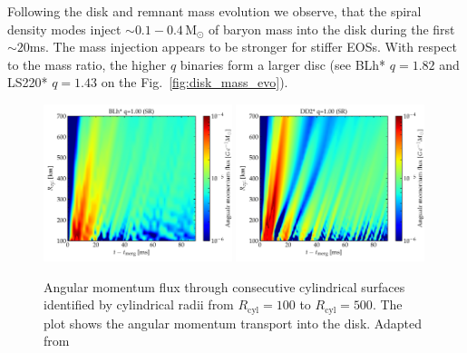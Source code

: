 \documentclass[11pt,a4paper,headinclude=true,DIV=14,BCOR=8mm,chapterprefix,listof=totoc,twoside,openright,abstracton]{scrbook}
\def\Msun{{\text{M}_{\odot}}}
\newcommand{\mr}{mass ratio}
\begin{document}
Following the disk and remnant mass evolution we observe, that the spiral 
density modes inject ${\sim}0.1-0.4\,\Msun$ of baryon mass into the disk during the 
first ${\sim}20$ms. 
The mass injection appears to be stronger for stiffer \acp{EOS}. 
With respect to the \mr{}, the higher $q$ binaries form a larger disc 
(see BLh* $q=1.82$ and LS220* $q=1.43$ on the Fig.~\ref{fig:disk_mass_evo}).

\begin{figure}[t]
    \centering 
    \includegraphics[width=0.49\textwidth]{./figs/remnant/evol_jflux_2d_BLh_M13651365_M0_SR_R1.pdf}
    \includegraphics[width=0.49\textwidth]{./figs/remnant/evol_jflux_2d_DD2_M13641364_M0_SR_R1.pdf}
    \caption{Angular momentum flux through consecutive cylindrical
        surfaces identified by cylindrical radii from $R_{\text{cyl}}=100$ to $R_{\text{cyl}}=500$. The
        plot shows the angular momentum transport into the disk.
    Adapted from \citet{Nedora:2020pak}
    }
    \label{fig:disk_ang_mom_flux_map_blh_q1}
\end{figure}
\end{document}
